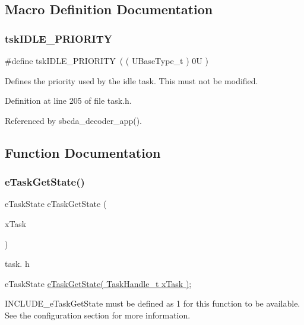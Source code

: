 \subsection{Macro Definition Documentation}
\mbox{\label{group___tasks_ga94ed0b9b3b4e8ccc859c322f18583e67}} 
\subsubsection{\texorpdfstring{tsk\+I\+D\+L\+E\+\_\+\+P\+R\+I\+O\+R\+I\+TY}{tskIDLE\_PRIORITY}}
{\footnotesize\ttfamily \#define tsk\+I\+D\+L\+E\+\_\+\+P\+R\+I\+O\+R\+I\+TY~( ( U\+Base\+Type\+\_\+t ) 0\+U )}

Defines the priority used by the idle task. This must not be modified. 

Definition at line 205 of file task.\+h.



Referenced by sbcda\+\_\+decoder\+\_\+app().



\subsection{Function Documentation}
\mbox{\label{group___tasks_ga954df77397d616484edb7c58c7760b10}} 
\subsubsection{\texorpdfstring{e\+Task\+Get\+State()}{eTaskGetState()}}
{\footnotesize\ttfamily e\+Task\+State e\+Task\+Get\+State (\begin{DoxyParamCaption}\item[{Task\+Handle\+\_\+t}]{x\+Task }\end{DoxyParamCaption})}

task. h 
\begin{DoxyPre}eTaskState \hyperlink{group___tasks_ga954df77397d616484edb7c58c7760b10}{eTaskGetState( TaskHandle\_t xTask )};\end{DoxyPre}


I\+N\+C\+L\+U\+D\+E\+\_\+e\+Task\+Get\+State must be defined as 1 for this function to be available. See the configuration section for more information.

